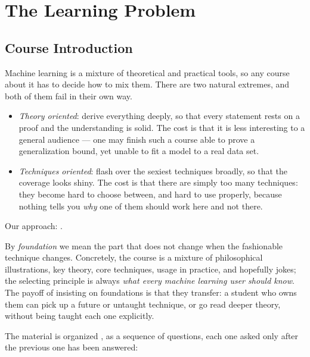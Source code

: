 \chapter{The Learning Problem}

\section{Course Introduction}


Machine learning is a mixture of theoretical and practical tools, so any course
about it has to decide how to mix them. There are two natural extremes, and both
of them fail in their own way.

\begin{itemize}
    \item \emph{Theory oriented}: derive everything deeply, so that every
        statement rests on a proof and the understanding is solid. The cost is
        that it is less interesting to a general audience --- one may finish such
        a course able to prove a generalization bound, yet unable to fit a model
        to a real data set.
    \item \emph{Techniques oriented}: flash over the sexiest techniques broadly,
        so that the coverage looks shiny. The cost is that there are simply too
        many techniques: they become hard to choose between, and hard to use
        properly, because nothing tells you \emph{why} one of them should work
        here and not there.
\end{itemize}

\begin{moral}
    Our approach: .
\end{moral}

By \emph{foundation} we mean the part that does not change when the fashionable
technique changes. Concretely, the course is a mixture of philosophical
illustrations, key theory, core techniques, usage in practice, and hopefully
jokes; the selecting principle is always \emph{what every machine learning user
should know}. The payoff of insisting on foundations is that they transfer: a
student who owns them can pick up a future or untaught technique, or go read
deeper theory, without being taught each one explicitly.

The material is organized , as a sequence of questions, each
one asked only after the previous one has been answered:

